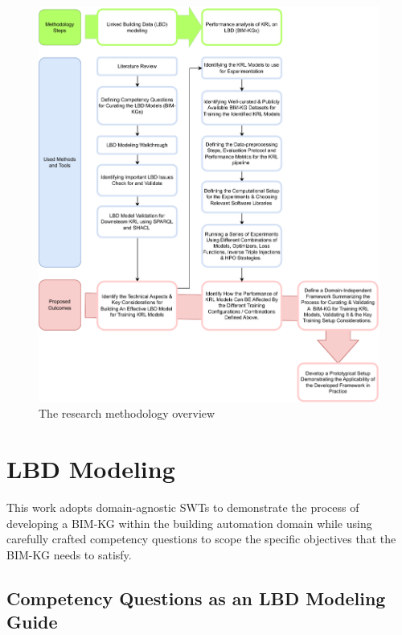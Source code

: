 \begin{figure}[!th]
    \centering
    \includegraphics[width=1.0\textwidth]{figures/Methodology.pdf}
    \caption{The research methodology overview} \label{fig: research methodology overview}
\end{figure}

\section{\acf{LBD} Modeling}\label{sec: linked building data modeling}
This work adopts domain-agnostic \acp{SWT} to demonstrate the process of developing a \ac{BIM-KG} within the building automation domain while using carefully crafted competency questions to scope the specific objectives that the \ac{BIM-KG} needs to satisfy.

\subsection{Competency Questions as an \ac{LBD} Modeling Guide}

